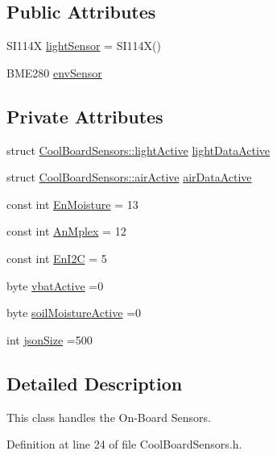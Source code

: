 \subsection*{Public Attributes}
\begin{DoxyCompactItemize}
\item 
S\+I114X \hyperlink{classCoolBoardSensors_a3e397300fb707dd193e909a757bf6102}{light\+Sensor} = S\+I114X()
\item 
B\+M\+E280 \hyperlink{classCoolBoardSensors_a868e38985e9a2412829fa2790ca13e2e}{env\+Sensor}
\end{DoxyCompactItemize}
\subsection*{Private Attributes}
\begin{DoxyCompactItemize}
\item 
struct \hyperlink{structCoolBoardSensors_1_1lightActive}{Cool\+Board\+Sensors\+::light\+Active} \hyperlink{classCoolBoardSensors_ac4deb1cf41bac8b91c780c92fab00ba4}{light\+Data\+Active}
\item 
struct \hyperlink{structCoolBoardSensors_1_1airActive}{Cool\+Board\+Sensors\+::air\+Active} \hyperlink{classCoolBoardSensors_abff8dfeccb2f7689847bb64d5f1cd31e}{air\+Data\+Active}
\item 
const int \hyperlink{classCoolBoardSensors_a6177d02e14a057a2f171a2e930b5038d}{En\+Moisture} = 13
\item 
const int \hyperlink{classCoolBoardSensors_a12ef28b1046219e0aee10bf64e28c4a5}{An\+Mplex} = 12
\item 
const int \hyperlink{classCoolBoardSensors_aaa6b5dbf3a6633bffd9d204d961096dc}{En\+I2C} = 5
\item 
byte \hyperlink{classCoolBoardSensors_af5039ad760b0ff0aa7eee16c55e81702}{vbat\+Active} =0
\item 
byte \hyperlink{classCoolBoardSensors_a31983eecc0f9cd000e1f912206ea4dc8}{soil\+Moisture\+Active} =0
\item 
int \hyperlink{classCoolBoardSensors_a05a40dc80bfff14ffb830f549b876f8d}{json\+Size} =500
\end{DoxyCompactItemize}


\subsection{Detailed Description}
This class handles the On-\/\+Board Sensors. 

Definition at line 24 of file Cool\+Board\+Sensors.\+h.



